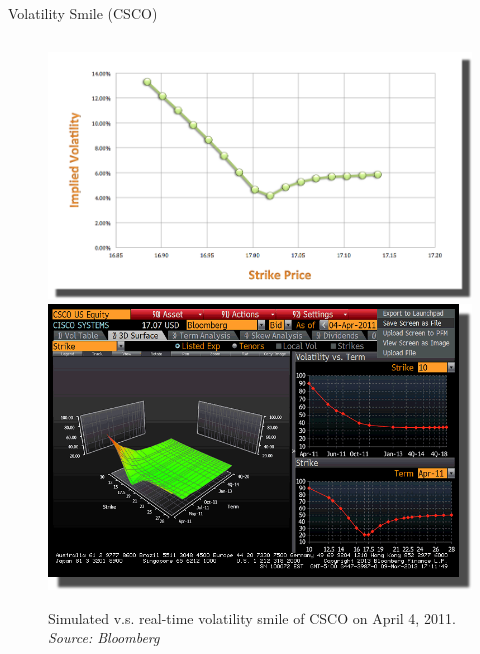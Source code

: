 \documentclass{beamer}
\begin{document}
\begin{frame}[shrink=50]{{\color{cyan}Volatility Smile ({\color{magenta}CSCO})}}
\begin{columns}
\begin{column}{0.7\textwidth}
\begin{figure}[htbp]
                \centering
                \includegraphics[height=0.75\textheight]{CSCO/CSCO_20110404_Simulated_Volatility_Smile.png}\\
                \includegraphics[height=0.75\textheight]{CSCO/CSCO_20110404_B.png}\\
                \caption{Simulated v.s. real-time volatility smile of CSCO on April 4, 2011. \textit{Source: Bloomberg}}
                \label{fig:CSCO_VolSmile_SimvsReal}
\end{figure}
\end{column}
\end{columns}

\end{frame}
\end{document}
